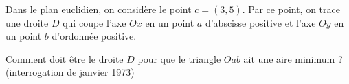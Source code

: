 \begin{exercice}\label{exoGeneral0015}

Dans le plan euclidien, on considère le point $c=(3,5)$. Par ce point, on trace une droite $D$ qui coupe l'axe $Ox$ en un point $a$ d'abscisse positive et l'axe $Oy$ en un point $b$ d'ordonnée positive.

Comment doit être le droite $D$ pour que le triangle $Oab$ ait une aire minimum ? (interrogation de janvier 1973)

\end{exercice}
